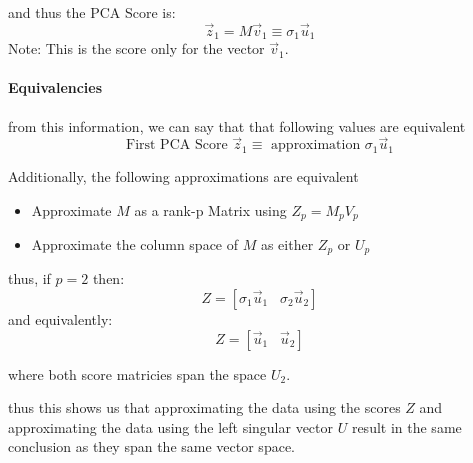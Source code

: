 \documentclass[12pt]{book}
\begin{document}
and thus the PCA Score is:
\[\vec z_1 = M\vec v_1 \equiv \sigma_1 \vec u_1\]
Note: This is the score only for the vector $\vec v_1$.  

\paragraph{Equivalencies}
from this information, we can say that that following values are equivalent
\[\text{First PCA Score }\vec z_1 \equiv \text{ approximation }\sigma_1\vec u_1\]

Additionally, the following approximations are equivalent
\begin{itemize}
        \item Approximate $M$ as a rank-p Matrix using $Z_p = M_pV_p$
        \item Approximate the column space of $M$ as either $Z_p$ or $U_p$
\end{itemize}

thus, if $p=2$ then:
\[Z = [\sigma_1\vec u_1\;\;\; \sigma_2\vec u_2]\]
and equivalently:
\[Z = [\vec u_1\;\;\;\vec u_2]\]

where both score matricies span the space $U_2$.

thus this shows us that approximating the data using the scores $Z$ and 
approximating the data using the left singular vector $U$ result in the same
conclusion as they span the same vector space.
\end{document}
